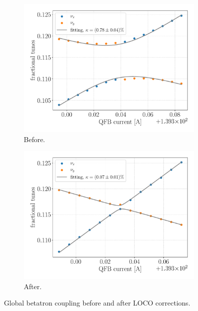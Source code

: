\begin{figure}
\centering
\begin{subfigure}[t]{0.49\textwidth}
\includegraphics[width=1.0\textwidth]{figures/coupling_before_loco_grid_filter.pdf}
    \caption{Before.}
    \label{subfig:coup_before}
\end{subfigure}
 \begin{subfigure}[t]{0.49\textwidth}
\includegraphics[width=1.0\textwidth]{figures/coupling_after_loco_grid_filter.pdf}
    \caption{After.}
    \label{subfig:coup_after}
\end{subfigure}
\caption{Global betatron coupling before and after LOCO corrections.}
\label{fig:global_coupling}
\end{figure}

